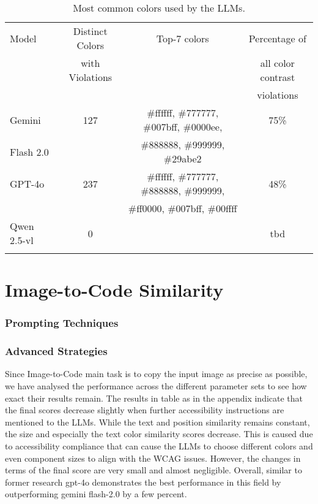 \begin{table}[ht]
\centering
\caption{Most common colors used by the LLMs.}
  \label{tab:colors}
  \begin{tabular}{lccc}
  \toprule
  Model        & Distinct Colors                 & Top-7 colors     & Percentage of       \\
               &         with Violations         &                  & all color contrast   \\ 
               &                                 &                  &  violations          \\ \midrule
  Gemini       & 127          & \#ffffff, \#777777, \#007bff, \#0000ee,  & 75\% \\
  Flash 2.0             &              & \#888888, \#999999, \#29abe2              &  \\
  GPT-4o       & 237          & \#ffffff, \#777777, \#888888, \#999999,  & 48\%  \\
      &              & \#ff0000, \#007bff, \#00ffff              &  \\
  Qwen 2.5-vl  & 0            &     & tbd \\
               &              &     &     \\
  \bottomrule
  \end{tabular}
\end{table}


\section{Image-to-Code Similarity}
\subsubsection{Prompting Techniques}
\subsubsection{Advanced Strategies}
Since Image-to-Code main task is to copy the input image as precise as possible,
we have analysed the performance across the different parameter sets to see how 
exact their results remain. The results in table as in the appendix 
indicate that the final scores decrease slightly when further accessibility 
instructions are mentioned to the LLMs. While the text and position similarity 
remains constant, the size and especially the text color similarity scores 
decrease. This is caused due to accessibility compliance that can cause the
LLMs to choose different colors and even component sizes to align with the 
WCAG issues. However, the changes in terms of the final score are very small 
and almost negligible.\newline
Overall, similar to former research gpt-4o demonstrates the best performance 
in this field by outperforming gemini flash-2.0 by a few percent.




